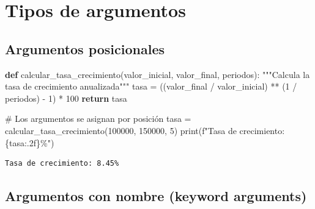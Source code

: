 \documentclass[
  doc,
  floatsintext,
  longtable,
  a4paper,
  nolmodern,
  notxfonts,
  notimes,
  12pt,
  colorlinks=true,linkcolor=blue,citecolor=blue,urlcolor=blue]{apa7}
\newenvironment{Shaded}{\begin{snugshade}}{\end{snugshade}}
\newcommand{\BuiltInTok}[1]{\textcolor[rgb]{0.00,0.23,0.31}{#1}}
\newcommand{\CommentTok}[1]{\textcolor[rgb]{0.37,0.37,0.37}{#1}}
\newcommand{\ControlFlowTok}[1]{\textcolor[rgb]{0.00,0.23,0.31}{\textbf{#1}}}
\newcommand{\DecValTok}[1]{\textcolor[rgb]{0.68,0.00,0.00}{#1}}
\newcommand{\KeywordTok}[1]{\textcolor[rgb]{0.00,0.23,0.31}{\textbf{#1}}}
\newcommand{\NormalTok}[1]{\textcolor[rgb]{0.00,0.23,0.31}{#1}}
\newcommand{\OperatorTok}[1]{\textcolor[rgb]{0.37,0.37,0.37}{#1}}
\newcommand{\SpecialCharTok}[1]{\textcolor[rgb]{0.37,0.37,0.37}{#1}}
\newcommand{\SpecialStringTok}[1]{\textcolor[rgb]{0.13,0.47,0.30}{#1}}
\begin{document}
\section{Tipos de argumentos}\label{tipos-de-argumentos}

\subsection{Argumentos posicionales}\label{argumentos-posicionales}

\begin{Shaded}
\begin{Highlighting}[]
\KeywordTok{def}\NormalTok{ calcular\_tasa\_crecimiento(valor\_inicial, valor\_final, periodos):}
    \CommentTok{"""Calcula la tasa de crecimiento anualizada"""}
\NormalTok{    tasa }\OperatorTok{=}\NormalTok{ ((valor\_final }\OperatorTok{/}\NormalTok{ valor\_inicial) }\OperatorTok{**}\NormalTok{ (}\DecValTok{1} \OperatorTok{/}\NormalTok{ periodos) }\OperatorTok{{-}} \DecValTok{1}\NormalTok{) }\OperatorTok{*} \DecValTok{100}
    \ControlFlowTok{return}\NormalTok{ tasa}

\CommentTok{\# Los argumentos se asignan por posición}
\NormalTok{tasa }\OperatorTok{=}\NormalTok{ calcular\_tasa\_crecimiento(}\DecValTok{100000}\NormalTok{, }\DecValTok{150000}\NormalTok{, }\DecValTok{5}\NormalTok{)}
\BuiltInTok{print}\NormalTok{(}\SpecialStringTok{f"Tasa de crecimiento: }\SpecialCharTok{\{}\NormalTok{tasa}\SpecialCharTok{:.2f\}}\SpecialStringTok{\%"}\NormalTok{)}
\end{Highlighting}
\end{Shaded}

\begin{verbatim}
Tasa de crecimiento: 8.45%
\end{verbatim}

\subsection{Argumentos con nombre (keyword
arguments)}\label{argumentos-con-nombre-keyword-arguments}
\end{document}
